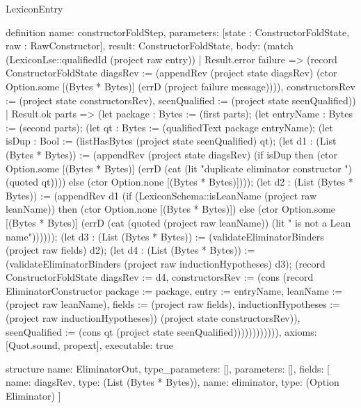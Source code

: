 \begin{lexlean}{LexiconEntry}
\begin{semanticmodule}
definition{
  name: constructorFoldStep,
  parameters: [state : ConstructorFoldState, raw : RawConstructor],
  result: ConstructorFoldState,
  body: (match (LexiconLse::qualifiedId (project raw entry))
    | Result.error failure => (record ConstructorFoldState {diagsRev := (appendRev (project state diagsRev) (ctor Option.some [(Bytes * Bytes)] (errD (project failure message)))), constructorsRev := (project state constructorsRev), seenQualified := (project state seenQualified)})
    | Result.ok parts => (let package : Bytes := (first parts); (let entryName : Bytes := (second parts); (let qt : Bytes := (qualifiedText package entryName); (let isDup : Bool := (listHasBytes (project state seenQualified) qt); (let d1 : (List (Bytes * Bytes)) := (appendRev (project state diagsRev) (if isDup then (ctor Option.some [(Bytes * Bytes)] (errD (cat (lit "duplicate eliminator constructor ") (quoted qt)))) else (ctor Option.none [(Bytes * Bytes)]))); (let d2 : (List (Bytes * Bytes)) := (appendRev d1 (if (LexiconSchema::isLeanName (project raw leanName)) then (ctor Option.none [(Bytes * Bytes)]) else (ctor Option.some [(Bytes * Bytes)] (errD (cat (quoted (project raw leanName)) (lit " is not a Lean name")))))); (let d3 : (List (Bytes * Bytes)) := (validateEliminatorBinders (project raw fields) d2); (let d4 : (List (Bytes * Bytes)) := (validateEliminatorBinders (project raw inductionHypotheses) d3); (record ConstructorFoldState {diagsRev := d4, constructorsRev := (cons (record EliminatorConstructor {package := package, entry := entryName, leanName := (project raw leanName), fields := (project raw fields), inductionHypotheses := (project raw inductionHypotheses)}) (project state constructorsRev)), seenQualified := (cons qt (project state seenQualified))})))))))))),
  axioms: [Quot.sound, propext],
  executable: true
}

structure{
  name: EliminatorOut,
  type_parameters: [],
  parameters: [],
  fields: [
    {name: diagsRev, type: (List (Bytes * Bytes))},
    {name: eliminator, type: (Option Eliminator)}
  ]
}


\end{semanticmodule}
\end{lexlean}
